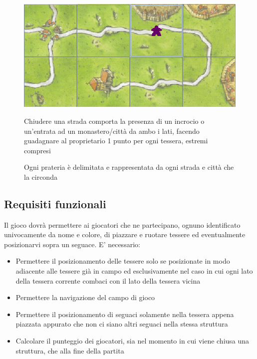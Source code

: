 \begin{figure}[]
    {\includegraphics[]{images/StradaMeeple.png}}

    \caption{Chiudere una strada comporta la presenza di un incrocio o un’entrata ad un monastero/città da ambo i lati, facendo guadagnare al proprietario 1 punto per ogni tessera, estremi compresi}
\end{figure}

\begin{figure}[]

    \caption{Ogni prateria è delimitata e rappresentata da ogni strada e città che la circonda}
    
\end{figure}

\subsection*{Requisiti funzionali}
Il gioco dovrà permettere ai giocatori che ne partecipano, ognuno identificato univocamente da nome e colore, di piazzare e ruotare tessere ed eventualmente posizionarvi sopra un seguace. E' necessario:

\begin{itemize}
\item Permettere il posizionamento delle tessere solo se posizionate in modo adiacente alle tessere già in campo ed esclusivamente nel caso in cui ogni lato della tessera corrente combaci con il lato della tessera vicina
\item Permettere la navigazione del campo di gioco
\item Permettere il posizionamento di seguaci solamente nella tessera appena piazzata appurato che non ci siano altri seguaci nella stessa struttura
\item Calcolare il punteggio dei giocatori, sia nel momento in cui viene chiusa una struttura, che alla fine della partita
\end{itemize}



